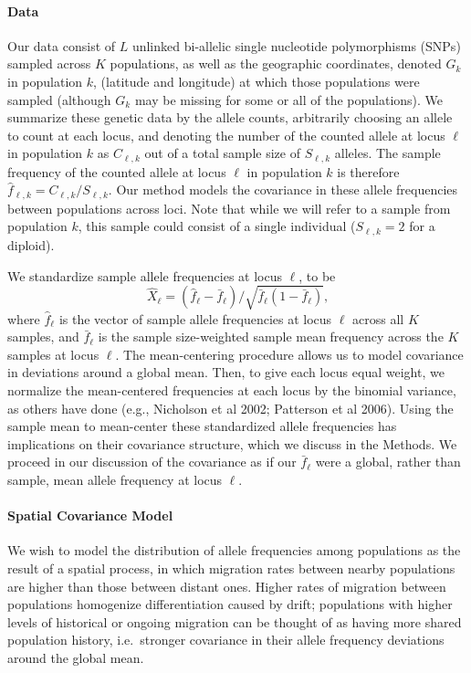 \documentclass[12pt]{article}
\begin{document}
\paragraph{Data}

Our data consist of $L$ unlinked bi-allelic single nucleotide polymorphisms (SNPs) sampled across $K$ populations, as well as the geographic coordinates, denoted $G_k$ in population $k$, (latitude and longitude) at which those populations were sampled (although $G_k$ may be missing for some or all of the populations). We summarize these genetic data by the allele counts, arbitrarily choosing an allele to count at each locus, and denoting the number of the counted allele at locus $\ell$ in population $k$ as $C_{\ell,k}$ out of a total sample size of $S_{\ell,k}$ alleles.  The sample frequency of the counted allele at locus $\ell$ in population $k$ is therefore $\hat{f}_{\ell,k} = C_{\ell,k}/S_{\ell,k}$.  Our method models the covariance in these allele frequencies between populations across loci. Note that while we will refer to a sample from population $k$, this sample could consist of a single individual ($S_{\ell,k}=2$ for a diploid). 

We standardize sample allele frequencies at locus $\ell$, to be
\begin{equation}
  \label{eq:standardized_sample_freqs}
  \hat{X}_\ell = (\hat{f}_{\ell}  - \bar{f}_{\ell})/\sqrt{\bar{f}_{\ell}(1-\bar{f}_{\ell})}\text{,}
\end{equation}
where $\hat{f}_{\ell}$ is the vector of sample allele frequencies at locus $\ell$ across all $K$ samples, and $\bar{f}_{\ell}$ is the sample size-weighted sample mean frequency across the $K$ samples at locus $\ell$.  The mean-centering procedure allows us to model covariance in deviations around a global mean. Then, to give each locus equal weight, we normalize the mean-centered frequencies at each locus by the binomial variance, as others have done (e.g., Nicholson et al 2002; Patterson et al 2006).  Using the sample mean to mean-center these standardized allele frequencies has implications on their covariance structure, which we discuss in the Methods.  We proceed in our discussion of the covariance as if our $\bar{f}_{\ell}$ were a global, rather than sample, mean allele frequency at locus $\ell$.


\paragraph{Spatial Covariance Model}
We wish to model the distribution of allele frequencies  among populations as the result of a spatial process, in which migration rates between nearby populations are higher than those between distant ones.  Higher rates of migration between populations homogenize differentiation caused by drift; populations with higher levels of historical or ongoing migration can be thought of as having more shared population history, i.e.\ stronger covariance in their allele frequency deviations around the global mean.
\end{document}
